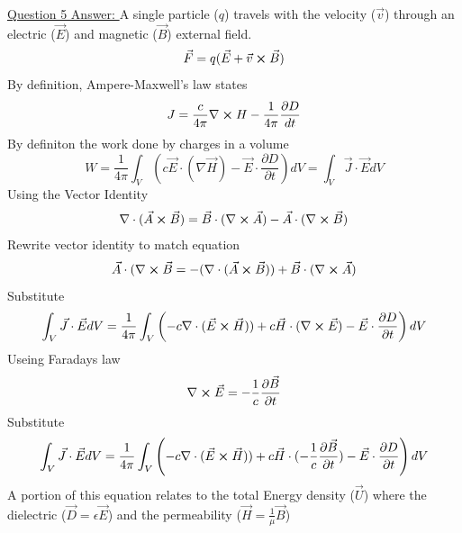 \documentclass[12pt]{article}
\begin{document}
    \underline{Question 5 Answer: }
    A single particle ($q$) travels with the velocity ($\vec{v}$) through an electric ($\vec{E}$) and magnetic ($\vec{B}$) external field. 
    \begin{equation} \label{eq: 5-1}
        \vec{F} = q (\vec{E} + \vec{v} \cross \vec{B})
    \end{equation}
    By definition, Ampere-Maxwell's law states
    \begin{equation} \label{eq: 5-2}
        J =\frac{c}{4 \pi} \nabla \cross H - \frac{1}{4\pi} \frac{\partial D}{dt}
    \end{equation}
    By definiton the work done by charges in a volume
    \begin{equation} \label{eq: 5-3}
        W = \frac{1}{4\pi} \int_V \left(c \vec{E} \cdot (\nabla \vec{H}) - \vec{E} \cdot \frac{\partial D}{\partial t} \right) dV = \int_V \vec{J} \cdot \vec{E} dV
    \end{equation}
    Using the Vector Identity
    \begin{gather*}
        \nabla \cdot (\vec{A} \cross \vec{B}) = \vec{B} \cdot (\nabla \cross \vec{A}) - \vec{A} \cdot (\nabla \cross \vec{B})
    \end{gather*}
    Rewrite vector identity to match equation
    \begin{equation} \label{eq: 5-4}
        \vec{A} \cdot (\nabla \cross \vec{B} = -(\nabla \cdot (\vec{A} \cross \vec{B})) + \vec{B} \cdot (\nabla \cross \vec{A})
    \end{equation}
    Substitute
    \begin{equation} \label{eq: 5-5}
        \int_V \vec{J} \cdot \vec{E} dV = \frac{1}{4\pi} \int_V \left(-c \nabla \cdot (\vec{E} \cross \vec{H})) + c \vec{H} \cdot (\nabla \cross \vec{E}) - \vec{E} \cdot \frac{\partial D}{\partial t} \right) dV 
    \end{equation}
    Useing Faradays law
    \begin{gather*}
        \nabla \cross \vec{E} = - \frac{1}{c} \frac{\partial \vec{B}}{\partial t}
    \end{gather*}
    Substitute
    \begin{equation} \label{eq: 5-6}
        \int_V \vec{J} \cdot \vec{E} dV = \frac{1}{4\pi} \int_V \left(-c \nabla \cdot (\vec{E} \cross \vec{H})) + c \vec{H} \cdot (- \frac{1}{c} \frac{\partial \vec{B}}{\partial t}) - \vec{E} \cdot \frac{\partial D}{\partial t} \right) dV 
    \end{equation}
    A portion of this equation relates to the total Energy density ($\vec{U}$) where the dielectric ($\vec{D} = \epsilon \vec{E}$) and the permeability ($\vec{H} = \frac{1}{\mu} \vec{B}$)
\end{document}
